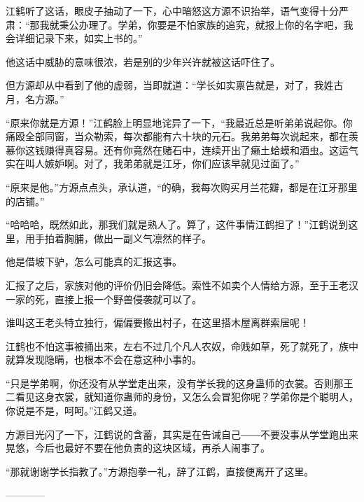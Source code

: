 \begin{this_body}
江鹤听了这话，眼皮子抽动了一下，心中暗怒这方源不识抬举，语气变得十分严肃：“那我就秉公办理了。学弟，你要是不怕家族的追究，就报上你的名字吧，我会详细记录下来，如实上书的。”

他这话中威胁的意味很浓，若是别的少年兴许就被这话吓住了。

但方源却从中看到了他的虚弱，当即就道：“学长如实禀告就是，对了，我姓古月，名方源。”

“原来你就是方源！”江鹤脸上明显地诧异了一下，“我最近总是听弟弟说起你。你痛殴全部同窗，当众勒索，每次都能有六十块的元石。我弟弟每次说起来，都在羡慕你这钱赚得真容易。还有你竟然在赌石中，连续开出了癞土蛤蟆和酒虫。这运气实在叫人嫉妒啊。对了，我弟弟就是江牙，你们应该早就见过面了。”

“原来是他。”方源点点头，承认道，“的确，我每次购买月兰花瓣，都是在江牙那里的店铺。”

“哈哈哈，既然如此，那我们就是熟人了。算了，这件事情江鹤担了！”江鹤说到这里，用手拍着胸脯，做出一副义气凛然的样子。

他是借坡下驴，怎么可能真的汇报这事。

汇报了之后，家族对他的评价仍旧会降低。索性不如卖个人情给方源，至于王老汉一家的死，直接上报一个野兽侵袭就可以了。

谁叫这王老头特立独行，偏偏要搬出村子，在这里搭木屋离群索居呢！

江鹤也不怕这事被捅出来，左右不过几个凡人农奴，命贱如草，死了就死了，族中就算发现隐瞒，也根本不会在意这种小事的。

“只是学弟啊，你还没有从学堂走出来，没有学长我的这身蛊师的衣裳。否则那王二看见这身衣裳，就知道你蛊师的身份，又怎么会冒犯你呢？学弟你是个聪明人，你说是不是，呵呵。”江鹤又道。

方源目光闪了一下，江鹤说的含蓄，其实是在告诫自己――不要没事从学堂跑出来晃悠，今后也最好不要在他负责的这块区域，再杀人闹事了。

“那就谢谢学长指教了。”方源抱拳一礼，辞了江鹤，直接便离开了这里。

------------

\end{this_body}

